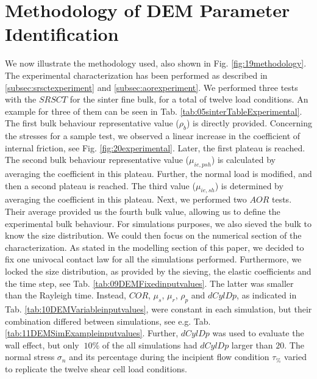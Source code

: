 \section{Methodology of DEM Parameter Identification}
\label{sec:methodology}

We now illustrate the methodology used, also shown in Fig.
\ref{fig:19methodology}.
%
The experimental characterization has been performed as described in
\ref{subsec:srsctexperiment} and \ref{subsec:aorexperiment}. We performed
three tests with the $SRSCT$ for the sinter fine bulk, for a total of twelve
load conditions. An example for three of them can be seen in Tab. \ref{tab:05sinterTableExperimental}.
% 
The first bulk behaviour representative value ($\rho_b$) is directly provided. 
Concerning the stresses for a sample test, we observed a linear increase in the
coefficient of internal friction, see Fig. \ref{fig:20experimental}.
Later, the first plateau is reached. 
The second bulk behaviour representative value ($\mu_{ie,psh}$) is calculated by averaging the coefficient in this plateau. 
Further, the normal load is modified, and then a second plateau is reached. The third value ($\mu_{ie,sh}$) is 
determined by averaging the coefficient in this plateau. 
Next, we performed two $AOR$ tests. 
Their average provided us the fourth bulk value, allowing us to define the experimental bulk behaviour. 
For simulations purposes, we also sieved the bulk to know the size distribution.
We could then focus on the numerical section of the characterization. 
As stated in the modelling section of this paper, we decided to fix one univocal contact law for all the simulations performed. 
Furthermore, we locked the size distribution, as provided by the sieving, the
elastic coefficients and the time step, see Tab.
\ref{tab:09DEMFixedinputvalues}.
% 
% 
The latter was smaller than the Rayleigh time. Instead, $COR$, $\mu_s$, $\mu_r$,
$\rho_p$ and $dCylDp$, as indicated in Tab. \ref{tab:10DEMVariableinputvalues},
were constant in each simulation, but their combination differed between
simulations, see e.g. Tab. \ref{tab:11DEMSimExampleinputvalues}.
% 
Further, $dCylDp$ was used to evaluate the wall effect, but only $~10\%$ of the
all simulations had $dCylDp$ larger than $20$. The normal stress $\sigma_n$ and its
percentage during the incipient flow condition $\tau_{\%}$ 
varied to replicate the twelve shear cell load conditions. 
